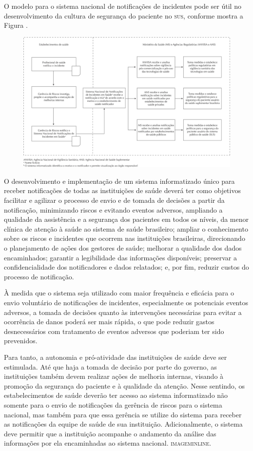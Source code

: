 \documentclass{article}
\begin{document}
O modelo para o sistema nacional de notificações de incidentes pode ser útil no
desenvolvimento da cultura de segurança do paciente no \textsc{sus}, conforme mostra a
Figura .

\begin{figure}
\includegraphics[width=\textwidth]{0034-8910-rsp-47-04-0791-gf01}
\caption{}
\end{figure}

O desenvolvimento e implementação de um sistema informatizado único para receber
notificações de todas as instituições de saúde deverá ter como objetivos
facilitar e
agilizar o processo de envio e de tomada de decisões a partir da notificação,
minimizando
riscos e evitando eventos adversos, ampliando a qualidade da assistência e a
segurança dos
pacientes em todos os níveis, da menor clínica de atenção à saúde ao sistema de
saúde
brasileiro; ampliar o conhecimento sobre os riscos e incidentes que ocorrem nas
instituições
brasileiras, direcionando o planejamento de ações dos gestores de saúde;
melhorar a
qualidade dos dados encaminhados; garantir a legibilidade das informações
disponíveis;
preservar a confidencialidade dos notificadores e dados relatados; e, por fim,
reduzir
custos do processo de notificação.

À medida que o sistema seja utilizado com maior frequência e eficácia para o
envio
voluntário de notificações de incidentes, especialmente os potenciais eventos
adversos, a
tomada de decisões quanto às intervenções necessárias para evitar a ocorrência
de danos
poderá ser mais rápida, o que pode reduzir gastos desnecessários com tratamento
de eventos
adversos que poderiam ter sido prevenidos.

Para tanto, a autonomia e pró-atividade das instituições de saúde deve ser
estimulada. Até
que haja a tomada de decisão por parte do governo, as instituições também devem
realizar
ações de melhoria internas, visando à promoção da segurança do paciente e à
qualidade da
atenção. Nesse sentindo, os estabelecimentos de saúde deverão ter acesso ao
sistema
informatizado não somente para o envio de notificações da gerência de riscos
para o sistema
nacional, mas também para que essa gerência se utilize do sistema para receber
as
notificações da equipe de saúde de sua instituição. Adicionalmente, o sistema
deve permitir
que a instituição acompanhe o andamento da análise das informações por ela
encaminhadas ao
sistema nacional. \textsc{imageminline}.
\end{document}
